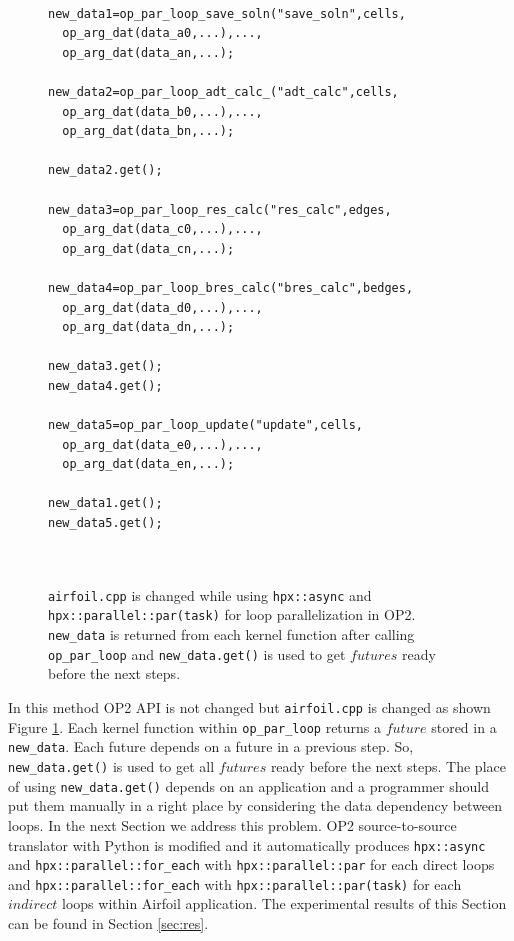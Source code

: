 \documentclass[conference]{IEEEtran}
\begin{document}
\begin{figure} [!h]
    \begin{lstlisting}   

new_data1=op_par_loop_save_soln("save_soln",cells,
  op_arg_dat(data_a0,...),...,
  op_arg_dat(data_an,...);
  
new_data2=op_par_loop_adt_calc_("adt_calc",cells,
  op_arg_dat(data_b0,...),...,
  op_arg_dat(data_bn,...);
   
new_data2.get();  
   
new_data3=op_par_loop_res_calc("res_calc",edges,
  op_arg_dat(data_c0,...),...,
  op_arg_dat(data_cn,...);
 
new_data4=op_par_loop_bres_calc("bres_calc",bedges,
  op_arg_dat(data_d0,...),...,
  op_arg_dat(data_dn,...);
   
new_data3.get();
new_data4.get();
 
new_data5=op_par_loop_update("update",cells,
  op_arg_dat(data_e0,...),...,
  op_arg_dat(data_en,...);

new_data1.get();
new_data5.get();

    
    \end{lstlisting}
    \caption{\small{\texttt{airfoil.cpp} is changed while using \texttt{hpx::async} and \texttt{hpx::parallel::par(task)} for loop parallelization in OP2. \texttt{new\_data} is returned from each kernel function after calling \texttt{op\_par\_loop} and \texttt{new\_data.get()} is used to get $futures$ ready before the next steps.}}
    \label{l4}
\end{figure}


In this method OP2 API is not changed but \texttt{airfoil.cpp} is changed as shown Figure \ref{l4}. Each kernel function within \texttt{op\_par\_loop} returns a $future$ stored in a \texttt{new\_data}. Each future depends on a future in a previous step. So, \texttt{new\_data.get()} is used to get all $futures$ ready before the next steps. The place of using \texttt{new\_data.get()} depends on an application and a programmer should put them manually in a right place by considering the data dependency between loops. In the next Section we address this problem. OP2 source-to-source translator with Python is modified and it automatically produces \texttt{hpx::async} and \texttt{hpx::parallel::for\_each} with \texttt{hpx::parallel::par} for each direct loops and \texttt{hpx::parallel::for\_each} with \texttt{hpx::parallel::par(task)} for each $indirect$ loops within Airfoil application. The experimental results of this Section can be found in Section \ref{sec:res}.
\end{document}
